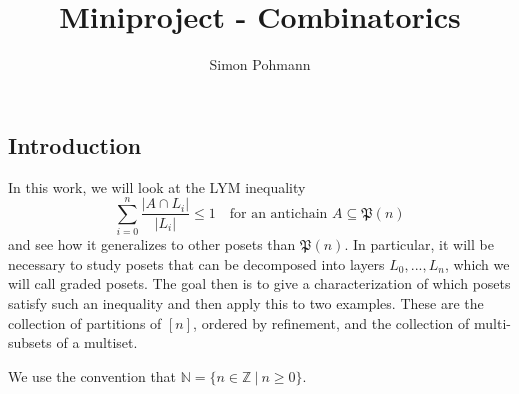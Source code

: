 \documentclass{scrartcl}
\title{Miniproject - Combinatorics}
\author{Simon Pohmann}
\date{}
\newcommand{\N}{\mathbb{N}}
\newcommand{\Z}{\mathbb{Z}}
\newcommand{\powerset}{\mathfrak{P}}
\theoremstyle{definition}
\begin{document}
\maketitle

\subsection*{Introduction}
In this work, we will look at the LYM inequality
\begin{equation*}
    \sum_{i = 0}^n \frac {|A \cap L_i|} {|L_i|} \leq 1 \quad \text{for an antichain $A \subseteq \powerset(n)$}
\end{equation*}
and see how it generalizes to other posets than $\powerset(n)$.
In particular, it will be necessary to study posets that can be decomposed into layers $L_0, ..., L_n$, which we will call graded posets.
The goal then is to give a characterization of which posets satisfy such an inequality and then apply this to two examples.
These are the collection of partitions of $[n]$, ordered by refinement, and the collection of multi-subsets of a multiset.

We use the convention that $\N = \{ n \in \Z \ | \ n \geq 0 \}$.
\end{document}

